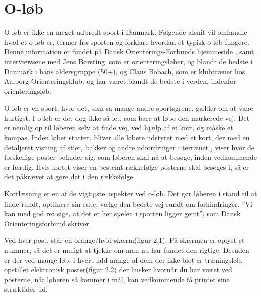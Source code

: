 \section{O-løb}
O-løb er ikke en meget udbredt sport i Danmark. Følgende afsnit vil omhandle hvad et o-løb er, termer fra sporten og forklare hvordan et typisk o-løb fungere. Denne information er fundet på Dansk Orienterings-Forbunds hjemmeside \citep{DOF}, samt interviewsene med Jens Børsting, som er orienteringsløber, og blandt de bedste i Danmark i hans aldersgruppe (50+), og Claus Bobach, som er klubtræner hos Aalborg Orienteringsklub, og har været blandt de bedste i verden, indenfor orienteringsløb.

O-løb er en sport, hvor det, som så mange andre sportsgrene, gælder om at være hurtigst. I o-løb er det dog ikke så let, som bare at løbe den markerede vej. Det er nemlig op til løberen selv at finde vej, ved hjælp af et kort, og måske et kompas. Inden løbet starter, bliver alle løbere udstyret med et kort, der med en detaljeret visning af stier, bakker og andre udfordringer i terrænet , viser hvor de forskellige poster befinder sig, som løberen skal nå at besøge, inden vedkommende er færdig. Hvis kortet viser en bestemt rækkefølge posterne skal besøges i, så er det påkrævet at gøre det i den rækkefølge. 

Kortlæsning er en af de vigtigste aspekter ved o-løb. Det gør løberen i stand til at finde rundt, optimere sin rute, vælge den bedste vej rundt om forhindringer. ”Vi kan med god ret sige, at det er her sjælen i sporten ligger gemt”, som Dansk Orienteringsforbund skriver.   

Ved hver post, står en  orange/hvid skærm(figur 2.1). På skærmen er oplyst et nummer, så det er muligt at tjekke om man nu har fundet den rigtige. Desuden er der ved mange løb, i hvert fald mange af dem der ikke blot er træningsløb, opstillet elektronisk poster(figur 2.2) der husker hvornår du har været ved posterne, når løberen så kommer i mål, kan vedkommende få printet sine stræktider ud.

